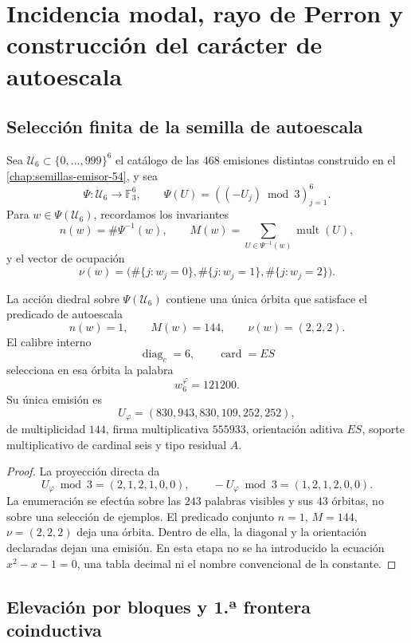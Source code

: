 \section{Incidencia modal, rayo de Perron y construcción del carácter de autoescala}
\label{p12-83-c9-s3:chap:biografia-completa-phi}

\subsection{Selección finita de la semilla de autoescala}

Sea \(\mathcal U_6\subset\{0,\ldots,999\}^6\) el catálogo de las
\(468\) emisiones distintas construido en el
\cref{chap:semillas-emisor-54}, y sea
\[
 \Psi:\mathcal U_6\longrightarrow\mathbb F_3^6,
 \qquad
 \Psi(U)=((-U_j)\bmod3)_{j=1}^{6}.
\]
Para \(w\in\Psi(\mathcal U_6)\), recordamos los invariantes
\[
 n(w)=\#\Psi^{-1}(w),
 \qquad
 M(w)=\sum_{U\in\Psi^{-1}(w)}\operatorname{mult}(U),
\]
y el vector de ocupación
\[
 \nu(w)=
 \bigl(\#\{j:w_j=0\},\#\{j:w_j=1\},\#\{j:w_j=2\}\bigr).
\]

\begin{theorem}
\label{p12-83-c9-s3:thm:seleccion-orbital-phi}
La acción diedral sobre \(\Psi(\mathcal U_6)\) contiene una única órbita
que satisface el predicado de autoescala
\[
 n(w)=1,
 \qquad
 M(w)=144,
 \qquad
 \nu(w)=(2,2,2).
\]
El calibre interno
\[
 \operatorname{diag}_c=6,
 \qquad
 \operatorname{card}=ES
\]
selecciona en esa órbita la palabra
\[
 \boxed{w_6^{\varphi}=121200.}
\]
Su única emisión es
\[
 \boxed{U_{\varphi}=(830,943,830,109,252,252),}
\]
de multiplicidad \(144\), firma multiplicativa \(555933\), orientación
aditiva \(ES\), soporte multiplicativo de cardinal seis y tipo residual
\(A\).
\end{theorem}

\begin{proof}
La proyección directa da
\[
 U_{\varphi}\bmod3=(2,1,2,1,0,0),
 \qquad
 -U_{\varphi}\bmod3=(1,2,1,2,0,0).
\]
La enumeración se efectúa sobre las \(243\) palabras visibles y sus
\(43\) órbitas, no sobre una selección de ejemplos. El predicado conjunto
\(n=1\), \(M=144\), \(\nu=(2,2,2)\) deja una órbita. Dentro de ella, la
diagonal y la orientación declaradas dejan una emisión. En esta etapa no
se ha introducido la ecuación \(x^2-x-1=0\), una tabla decimal ni el nombre
convencional de la constante.
\end{proof}

\subsection{Elevación por bloques y 1.ª frontera coinductiva}

